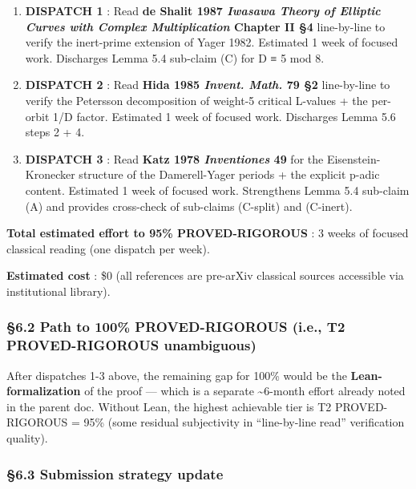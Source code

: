 \documentclass[
  11pt,
  a4paper,
]{article}
\begin{document}
\begin{enumerate}
\def\labelenumi{\arabic{enumi}.}
\item
  \textbf{DISPATCH 1} : Read \textbf{de Shalit 1987 \emph{Iwasawa Theory of Elliptic Curves with Complex Multiplication} Chapter II §4} line-by-line to verify the inert-prime extension of Yager 1982. Estimated 1 week of focused work. Discharges Lemma 5.4 sub-claim (C) for D ≡ 5 mod 8.
\item
  \textbf{DISPATCH 2} : Read \textbf{Hida 1985 \emph{Invent. Math.} 79 §2} line-by-line to verify the Petersson decomposition of weight-5 critical L-values + the per-orbit 1/\textbar D\textbar{} factor. Estimated 1 week of focused work. Discharges Lemma 5.6 steps 2 + 4.
\item
  \textbf{DISPATCH 3} : Read \textbf{Katz 1978 \emph{Inventiones} 49} for the Eisenstein-Kronecker structure of the Damerell-Yager periods + the explicit p-adic content. Estimated 1 week of focused work. Strengthens Lemma 5.4 sub-claim (A) and provides cross-check of sub-claims (C-split) and (C-inert).
\end{enumerate}

\textbf{Total estimated effort to 95\% PROVED-RIGOROUS} : 3 weeks of focused classical reading (one dispatch per week).

\textbf{Estimated cost} : \$0 (all references are pre-arXiv classical sources accessible via institutional library).

\hypertarget{path-to-100-proved-rigorous-i.e.-t2-proved-rigorous-unambiguous}{%
\subsubsection{§6.2 Path to 100\% PROVED-RIGOROUS (i.e., T2 PROVED-RIGOROUS unambiguous)}\label{path-to-100-proved-rigorous-i.e.-t2-proved-rigorous-unambiguous}}

After dispatches 1-3 above, the remaining gap for 100\% would be the \textbf{Lean-formalization} of the proof --- which is a separate \textasciitilde6-month effort already noted in the parent doc. Without Lean, the highest achievable tier is T2 PROVED-RIGOROUS = 95\% (some residual subjectivity in ``line-by-line read'' verification quality).

\hypertarget{submission-strategy-update}{%
\subsubsection{§6.3 Submission strategy update}\label{submission-strategy-update}}
\end{document}
